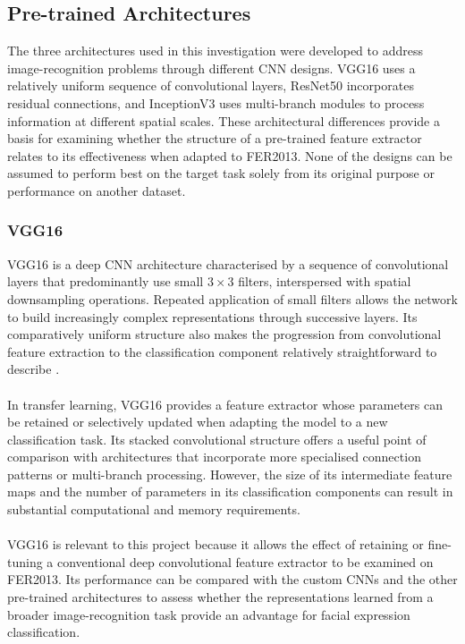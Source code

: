 \documentclass[12pt, a4paper]{report}
\let\oldsubsection\subsection
\renewcommand{\subsection}{%
    \Needspace{6\baselineskip}%
    \oldsubsection
}
\let\oldsubsubsection\subsubsection
\renewcommand{\subsubsection}{%
    \Needspace{6\baselineskip}%
    \oldsubsubsection
}
\begin{document}
			\subsection{Pre-trained Architectures}
				
				The three architectures used in this investigation were developed to address image-recognition problems through different CNN designs. VGG16 uses a relatively uniform sequence of convolutional layers, ResNet50 incorporates residual connections, and InceptionV3 uses multi-branch modules to process information at different spatial scales. These architectural differences provide a basis for examining whether the structure of a pre-trained feature extractor relates to its effectiveness when adapted to FER2013. None of the designs can be assumed to perform best on the target task solely from its original purpose or performance on another dataset.
				
				\subsubsection{VGG16}
				
					VGG16 is a deep CNN architecture characterised by a sequence of convolutional layers that predominantly use small $3\times3$ filters, interspersed with spatial downsampling operations. Repeated application of small filters allows the network to build increasingly complex representations through successive layers. Its comparatively uniform structure also makes the progression from convolutional feature extraction to the classification component relatively straightforward to describe \cite{simonyan2015vgg}.\\\\
					In transfer learning, VGG16 provides a feature extractor whose parameters can be retained or selectively updated when adapting the model to a new classification task. Its stacked convolutional structure offers a useful point of comparison with architectures that incorporate more specialised connection patterns or multi-branch processing. However, the size of its intermediate feature maps and the number of parameters in its classification components can result in substantial computational and memory requirements.\\\\
					VGG16 is relevant to this project because it allows the effect of retaining or fine-tuning a conventional deep convolutional feature extractor to be examined on FER2013. Its performance can be compared with the custom CNNs and the other pre-trained architectures to assess whether the representations learned from a broader image-recognition task provide an advantage for facial expression classification.
				
\end{document}
